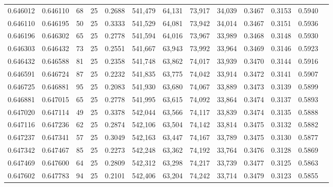 \begin{tabular}{rrrrrrrrrrrrr}
0.646012 & 0.646110 &    68 &  25 &                                     0.2688 & 541,479 &  64,131 &  73,917 &  34,039 & 0.3467 & 0.3153 & 0.5940 \\
0.646110 & 0.646195 &    50 &  25 &                                     0.3333 & 541,529 &  64,081 &  73,942 &  34,014 & 0.3467 & 0.3151 & 0.5936 \\
0.646196 & 0.646302 &    65 &  25 &                                     0.2778 & 541,594 &  64,016 &  73,967 &  33,989 & 0.3468 & 0.3148 & 0.5930 \\
0.646303 & 0.646432 &    73 &  25 &                                     0.2551 & 541,667 &  63,943 &  73,992 &  33,964 & 0.3469 & 0.3146 & 0.5923 \\
0.646432 & 0.646588 &    81 &  25 &                                     0.2358 & 541,748 &  63,862 &  74,017 &  33,939 & 0.3470 & 0.3144 & 0.5916 \\
0.646591 & 0.646724 &    87 &  25 &                                     0.2232 & 541,835 &  63,775 &  74,042 &  33,914 & 0.3472 & 0.3141 & 0.5907 \\
0.646725 & 0.646881 &    95 &  25 &                                     0.2083 & 541,930 &  63,680 &  74,067 &  33,889 & 0.3473 & 0.3139 & 0.5899 \\
0.646881 & 0.647015 &    65 &  25 &                                     0.2778 & 541,995 &  63,615 &  74,092 &  33,864 & 0.3474 & 0.3137 & 0.5893 \\
0.647020 & 0.647114 &    49 &  25 &                                     0.3378 & 542,044 &  63,566 &  74,117 &  33,839 & 0.3474 & 0.3135 & 0.5888 \\
0.647116 & 0.647236 &    62 &  25 &                                     0.2874 & 542,106 &  63,504 &  74,142 &  33,814 & 0.3475 & 0.3132 & 0.5882 \\
0.647237 & 0.647341 &    57 &  25 &                                     0.3049 & 542,163 &  63,447 &  74,167 &  33,789 & 0.3475 & 0.3130 & 0.5877 \\
0.647342 & 0.647467 &    85 &  25 &                                     0.2273 & 542,248 &  63,362 &  74,192 &  33,764 & 0.3476 & 0.3128 & 0.5869 \\
0.647469 & 0.647600 &    64 &  25 &                                     0.2809 & 542,312 &  63,298 &  74,217 &  33,739 & 0.3477 & 0.3125 & 0.5863 \\
0.647602 & 0.647783 &    94 &  25 &                                     0.2101 & 542,406 &  63,204 &  74,242 &  33,714 & 0.3479 & 0.3123 & 0.5855 \\

\end{tabular}
